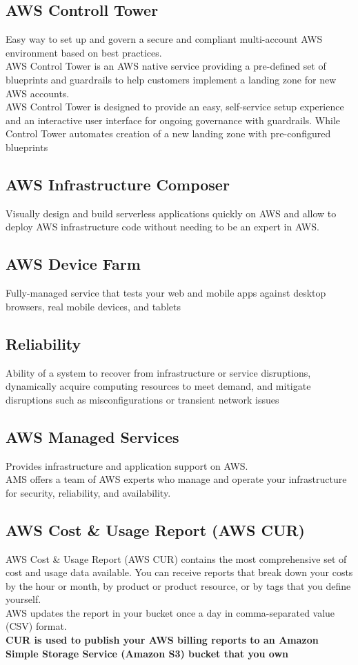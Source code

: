 \documentclass[12pt, letterpaper, twoside]{article}
\begin{document}
\subsection{AWS Controll Tower}
Easy way to set up and govern a secure and compliant multi-account AWS environment based on best practices.\\
AWS Control Tower is an AWS native service providing a pre-defined set of blueprints and guardrails to help customers 
implement a landing zone for new AWS accounts.\\
AWS Control Tower is designed to provide an easy, self-service setup experience and an interactive user interface for 
ongoing governance with guardrails. While Control Tower automates creation of a new landing zone with pre-configured blueprints


\subsection{AWS Infrastructure Composer}
Visually design and build serverless applications quickly on AWS and allow to deploy AWS infrastructure code without needing 
to be an expert in AWS.\\

\subsection{AWS Device Farm}
Fully-managed service that tests your web and mobile apps against desktop browsers, real mobile devices, and tablets

\subsection{Reliability}
Ability of a system to recover from infrastructure or service disruptions, dynamically acquire computing resources 
to meet demand, and mitigate disruptions such as misconfigurations or transient network issues

\subsection{AWS Managed Services}
Provides infrastructure and application support on AWS.\\
AMS offers a team of AWS experts who manage and operate your infrastructure for security, reliability, 
and availability.\\

\subsection{AWS Cost \& Usage Report (AWS CUR)}
AWS Cost \& Usage Report (AWS CUR) contains the most comprehensive set of cost and usage data available. You can receive reports 
that break down your costs by the hour or month, by product or product resource, or by tags that you define yourself.\\
AWS updates the report in your bucket once a day in comma-separated value (CSV) format.\\
\textbf{CUR is used to publish your AWS billing reports to an Amazon Simple Storage Service (Amazon S3) bucket that you own}
\end{document}
